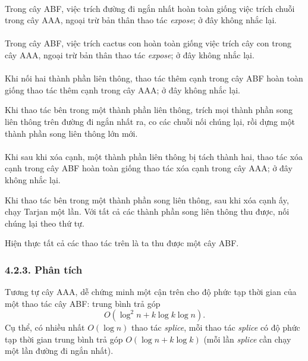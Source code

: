 \documentclass[11pt]{article}
\begin{document}
\paragraph{}
Trong cây ABF, việc trích đường đi ngắn nhất hoàn toàn giống việc trích chuỗi
trong cây AAA, ngoại trừ bản thân thao tác \emph{expose}; ở đây không nhắc
lại.

\paragraph{}
Trong cây ABF, việc trích cactus con hoàn toàn giống việc trích cây con trong
cây AAA, ngoại trừ bản thân thao tác \emph{expose}; ở đây không nhắc lại.

\paragraph{}
Khi nối hai thành phần liên thông, thao tác thêm cạnh trong cây ABF hoàn toàn
giống thao tác thêm cạnh trong cây AAA; ở đây không nhắc lại.

Khi thao tác bên trong một thành phần liên thông, trích mọi thành phần song
liên thông trên đường đi ngắn nhất ra, co các chuỗi nối chúng lại, rồi dựng
một thành phần song liên thông lớn mới.

\paragraph{}
Khi sau khi xóa cạnh, một thành phần liên thông bị tách thành hai, thao tác
xóa cạnh trong cây ABF hoàn toàn giống thao tác xóa cạnh trong cây AAA; ở đây
không nhắc lại.

Khi thao tác bên trong một thành phần song liên thông, sau khi xóa cạnh ấy,
chạy Tarjan một lần. Với tất cả các thành phần song liên thông thu được, nối
chúng lại theo thứ tự.

Hiện thực tất cả các thao tác trên là ta thu được một cây ABF.

\subsubsection*{4.2.3. Phân tích}

Tương tự cây AAA, dễ chứng minh một cận trên cho độ phức tạp thời gian của
một thao tác cây ABF: trung bình trả góp
\[
  O(\log^2 n+k\log k\log n).
\]
Cụ thể, có nhiều nhất \(O(\log n)\) thao tác \emph{splice}, mỗi thao tác
\emph{splice} có độ phức tạp thời gian trung bình trả góp
\(O(\log n+k\log k)\) (mỗi lần \emph{splice} cần chạy một lần đường đi ngắn
nhất).
\end{document}
